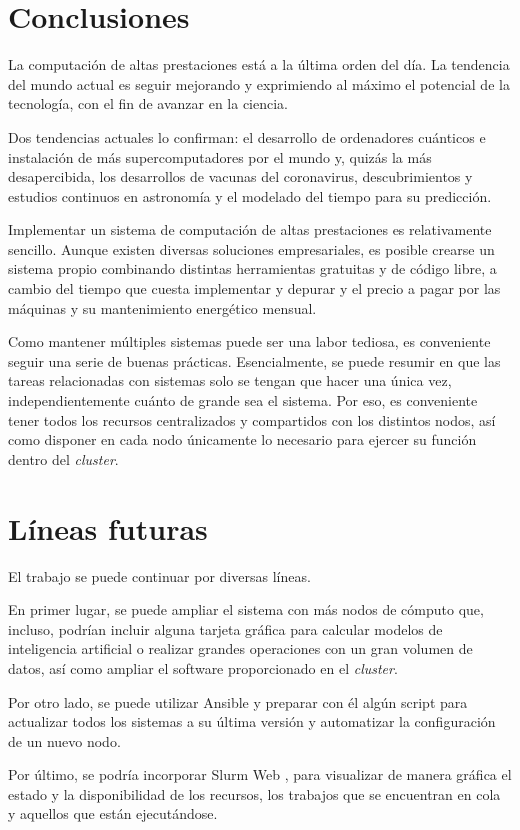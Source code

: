\section{Conclusiones}

La computación de altas prestaciones está a la última orden del día. La tendencia del mundo actual es seguir mejorando y exprimiendo al máximo el potencial de la tecnología, con el fin de avanzar en la ciencia.
\vspace{2mm}

Dos tendencias actuales lo confirman: el desarrollo de ordenadores cuánticos e instalación de más supercomputadores por el mundo y, quizás la más desapercibida, los desarrollos de vacunas del coronavirus, descubrimientos y estudios continuos en astronomía y el modelado del tiempo para su predicción. 
\vspace{2mm}

Implementar un sistema de computación de altas prestaciones es relativamente sencillo. Aunque existen diversas soluciones empresariales, es posible crearse un sistema propio combinando distintas herramientas gratuitas y de código libre, a cambio del tiempo que cuesta implementar y depurar y el precio a pagar por las máquinas y su mantenimiento energético mensual.
\vspace{2mm}

Como mantener múltiples sistemas puede ser una labor tediosa, es conveniente seguir una serie de buenas prácticas. Esencialmente, se puede resumir en que las tareas relacionadas con sistemas solo se tengan que hacer una única vez, independientemente cuánto de grande sea el sistema. Por eso, es conveniente tener todos los recursos centralizados y compartidos con los distintos nodos, así como disponer en cada nodo únicamente lo necesario para ejercer su función dentro del \emph{cluster}.

\section{Líneas futuras}

El trabajo se puede continuar por diversas líneas.
\vspace{4mm}

En primer lugar, se puede ampliar el sistema con más nodos de cómputo que, incluso, podrían incluir alguna tarjeta gráfica para calcular modelos de inteligencia artificial o realizar grandes operaciones con un gran volumen de datos, así como ampliar el software proporcionado en el \emph{cluster}.
\vspace{4mm}

Por otro lado, se puede utilizar Ansible \cite{ansible} y preparar con él algún script para actualizar todos los sistemas a su última versión y automatizar la configuración de un nuevo nodo.
\vspace{4mm}

Por último, se podría incorporar Slurm Web \cite{slurmweb}, para visualizar de manera gráfica el estado y la disponibilidad de los recursos, los trabajos que se encuentran en cola y aquellos que están ejecutándose.
